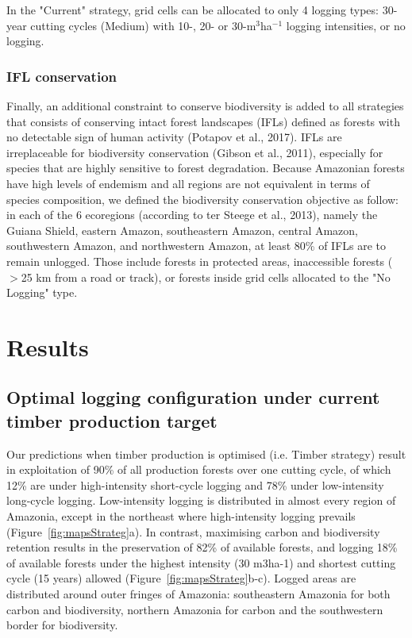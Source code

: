 \documentclass{article}
\begin{document}
In the "Current" strategy, grid cells can be allocated to only 4 logging types: 30-year cutting cycles (Medium) with 10-, 20- or 30-m$^3$ha$^{-1}$ logging intensities, or no logging. 

\subsubsection{IFL conservation}

Finally, an additional constraint to conserve biodiversity is added to all strategies that consists of conserving intact forest landscapes (IFLs) defined as forests with no detectable sign of human activity (Potapov et al., 2017). IFLs are irreplaceable for biodiversity conservation (Gibson et al., 2011), especially for species that are highly sensitive to forest degradation. Because Amazonian forests have high levels of endemism and all regions are not equivalent in terms of species composition, we defined the biodiversity conservation objective as follow: in each of the 6 ecoregions (according to ter Steege et al., 2013), namely the Guiana Shield, eastern Amazon, southeastern Amazon, central Amazon, southwestern Amazon, and northwestern Amazon, at least 80\% of IFLs are to remain unlogged. Those include forests in protected areas, inaccessible forests ($>$25 km from a road or track), or forests inside grid cells allocated to the "No Logging" type. 


\section{Results}

\subsection{Optimal logging configuration under current timber production target}

Our predictions when timber production is optimised (i.e. Timber strategy) result in exploitation of 90\% of all production forests over one cutting cycle, of which 12\% are under high-intensity short-cycle logging and 78\% under low-intensity long-cycle logging. Low-intensity logging is distributed in almost every region of Amazonia, except in the northeast where high-intensity logging prevails (Figure~\ref{fig:mapsStrateg}a). In contrast, maximising carbon and biodiversity retention results in the preservation of 82\% of available forests, and logging 18\% of available forests under the highest intensity (30 m3ha-1) and shortest cutting cycle (15 years) allowed (Figure~\ref{fig:mapsStrateg}b-c). Logged areas are distributed around outer fringes of Amazonia: southeastern Amazonia for both carbon and biodiversity, northern Amazonia for carbon and the southwestern border for biodiversity. 
\end{document}
